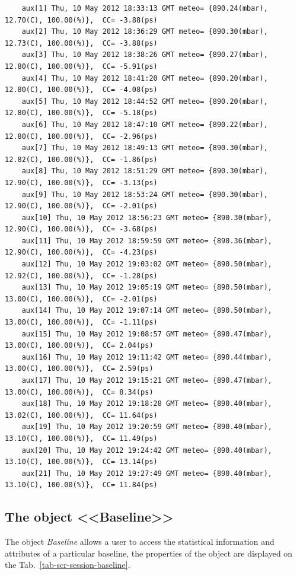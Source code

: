 \documentclass [10pt,letterpaper]{report}
\begin{document}
{{\begin{verbatim}
    aux[1] Thu, 10 May 2012 18:33:13 GMT meteo= {890.24(mbar), 12.70(C), 100.00(%)},  CC= -3.88(ps)
    aux[2] Thu, 10 May 2012 18:36:29 GMT meteo= {890.30(mbar), 12.73(C), 100.00(%)},  CC= -3.88(ps)
    aux[3] Thu, 10 May 2012 18:38:26 GMT meteo= {890.27(mbar), 12.80(C), 100.00(%)},  CC= -5.91(ps)
    aux[4] Thu, 10 May 2012 18:41:20 GMT meteo= {890.20(mbar), 12.80(C), 100.00(%)},  CC= -4.08(ps)
    aux[5] Thu, 10 May 2012 18:44:52 GMT meteo= {890.20(mbar), 12.80(C), 100.00(%)},  CC= -5.18(ps)
    aux[6] Thu, 10 May 2012 18:47:10 GMT meteo= {890.22(mbar), 12.80(C), 100.00(%)},  CC= -2.96(ps)
    aux[7] Thu, 10 May 2012 18:49:13 GMT meteo= {890.30(mbar), 12.82(C), 100.00(%)},  CC= -1.86(ps)
    aux[8] Thu, 10 May 2012 18:51:29 GMT meteo= {890.30(mbar), 12.90(C), 100.00(%)},  CC= -3.13(ps)
    aux[9] Thu, 10 May 2012 18:53:24 GMT meteo= {890.30(mbar), 12.90(C), 100.00(%)},  CC= -2.01(ps)
    aux[10] Thu, 10 May 2012 18:56:23 GMT meteo= {890.30(mbar), 12.90(C), 100.00(%)},  CC= -3.68(ps)
    aux[11] Thu, 10 May 2012 18:59:59 GMT meteo= {890.36(mbar), 12.90(C), 100.00(%)},  CC= -4.23(ps)
    aux[12] Thu, 10 May 2012 19:03:02 GMT meteo= {890.50(mbar), 12.92(C), 100.00(%)},  CC= -1.28(ps)
    aux[13] Thu, 10 May 2012 19:05:19 GMT meteo= {890.50(mbar), 13.00(C), 100.00(%)},  CC= -2.01(ps)
    aux[14] Thu, 10 May 2012 19:07:14 GMT meteo= {890.50(mbar), 13.00(C), 100.00(%)},  CC= -1.11(ps)
    aux[15] Thu, 10 May 2012 19:08:57 GMT meteo= {890.47(mbar), 13.00(C), 100.00(%)},  CC= 2.04(ps)
    aux[16] Thu, 10 May 2012 19:11:42 GMT meteo= {890.44(mbar), 13.00(C), 100.00(%)},  CC= 2.59(ps)
    aux[17] Thu, 10 May 2012 19:15:21 GMT meteo= {890.47(mbar), 13.00(C), 100.00(%)},  CC= 8.34(ps)
    aux[18] Thu, 10 May 2012 19:18:28 GMT meteo= {890.40(mbar), 13.02(C), 100.00(%)},  CC= 11.64(ps)
    aux[19] Thu, 10 May 2012 19:20:59 GMT meteo= {890.40(mbar), 13.10(C), 100.00(%)},  CC= 11.49(ps)
    aux[20] Thu, 10 May 2012 19:24:42 GMT meteo= {890.40(mbar), 13.10(C), 100.00(%)},  CC= 13.14(ps)
    aux[21] Thu, 10 May 2012 19:27:49 GMT meteo= {890.40(mbar), 13.10(C), 100.00(%)},  CC= 11.84(ps)
\end{verbatim}}





\subsection{The object <<Baseline>>}
\label{section-scripting-session-baseline}
The object {\sl Baseline} allows a user to access the statistical information and attributes
of a particular baseline, the properties of the object are displayed on the
Tab.~\ref{tab-scr-session-baseline}.

}
\end{document}
